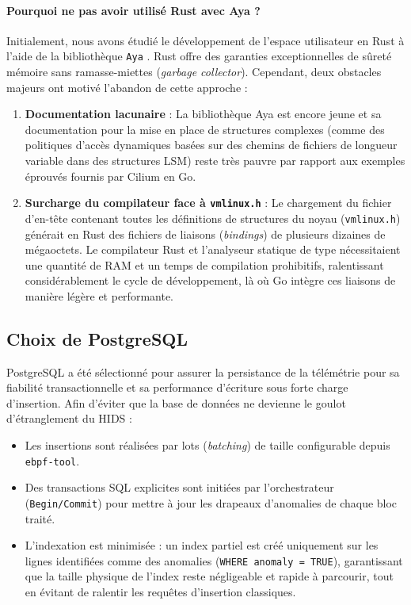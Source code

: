\documentclass[11pt,a4paper]{article}
\begin{document}
\paragraph{Pourquoi ne pas avoir utilisé Rust avec Aya ?}
Initialement, nous avons étudié le développement de l'espace utilisateur en Rust à l'aide de la bibliothèque \texttt{Aya} \cite{blandy}. Rust offre des garanties exceptionnelles de sûreté mémoire sans ramasse-miettes (\textit{garbage collector}). Cependant, deux obstacles majeurs ont motivé l'abandon de cette approche :
\begin{enumerate}
    \item \textbf{Documentation lacunaire} : La bibliothèque Aya est encore jeune et sa documentation pour la mise en place de structures complexes (comme des politiques d'accès dynamiques basées sur des chemins de fichiers de longueur variable dans des structures LSM) reste très pauvre par rapport aux exemples éprouvés fournis par Cilium en Go.
    \item \textbf{Surcharge du compilateur face à \texttt{vmlinux.h}} : Le chargement du fichier d'en-tête contenant toutes les définitions de structures du noyau (\texttt{vmlinux.h}) générait en Rust des fichiers de liaisons (\textit{bindings}) de plusieurs dizaines de mégaoctets. Le compilateur Rust et l'analyseur statique de type nécessitaient une quantité de RAM et un temps de compilation prohibitifs, ralentissant considérablement le cycle de développement, là où Go intègre ces liaisons de manière légère et performante.
\end{enumerate}

\subsection{Choix de PostgreSQL}
PostgreSQL a été sélectionné pour assurer la persistance de la télémétrie pour sa fiabilité transactionnelle et sa performance d'écriture sous forte charge d'insertion. Afin d'éviter que la base de données ne devienne le goulot d'étranglement du HIDS :
\begin{itemize}
    \item Les insertions sont réalisées par lots (\textit{batching}) de taille configurable depuis \texttt{ebpf-tool}.
    \item Des transactions SQL explicites sont initiées par l'orchestrateur (\texttt{Begin/Commit}) pour mettre à jour les drapeaux d'anomalies de chaque bloc traité.
    \item L'indexation est minimisée : un index partiel est créé uniquement sur les lignes identifiées comme des anomalies (\texttt{WHERE anomaly = TRUE}), garantissant que la taille physique de l'index reste négligeable et rapide à parcourir, tout en évitant de ralentir les requêtes d'insertion classiques.
\end{itemize}
\end{document}
